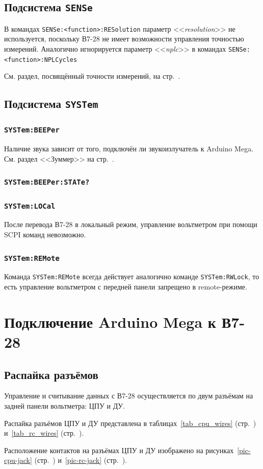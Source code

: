 \documentclass[12pt, a4paper]{article}
\newcommand{\V}{\mbox{В7-28}}
\newcommand{\Arduino}{Arduino Mega}
\newcommand{\CMD}[1]{{\tt #1}}
\newcommand{\PARAM}[1]{<<{\it #1}>>}
\newcommand{\SUBSYSTEMSECTION}[1]{\subsection{Подсистема \CMD{#1}}}
\newcommand{\CMDSECTION}[1]{\subsubsection*{\CMD{#1}}}
\begin{document}
\SUBSYSTEMSECTION{SENSe}

В командах \CMD{SENSe:<function>:RESolution} параметр \PARAM{resolution} не используется, поскольку \V{} не имеет возможности управления точностью измерений. Аналогично игнорируется параметр \PARAM{nplc} в командах \CMD{SENSe:<function>:NPLCycles}

См. раздел, посвящённый точности измерений, на стр.~\pageref{sec_precision}.

\SUBSYSTEMSECTION{SYSTem}

\CMDSECTION{SYSTem:BEEPer}

Наличие звука зависит от того, подключён ли звукоизлучатель к \Arduino{}. См. раздел <<Зуммер>> на стр.~\pageref{sec_zummer}.

\CMDSECTION{SYSTem:BEEPer:STATe?}
\CMDSECTION{SYSTem:LOCal}

После перевода \V{} в локальный режим, управление вольтметром при помощи SCPI команд невозможно.

\CMDSECTION{SYSTem:REMote}

Команда \CMD{SYSTem:REMote} всегда действует аналогично команде \CMD{SYSTem:RWLock}, то есть управление вольтметром с передней панели запрещено в remote-режиме.

\section{Подключение {\Arduino} к \V}

\subsection{Распайка разъёмов}

Управление и считывание данных с {\V} осуществляется по двум разъёмам на задней панели вольтметра: ЦПУ и ДУ.

Распайка разъёмов ЦПУ и ДУ представлена в таблицах~\ref{tab_cpu_wires} (стр.~\pageref{tab_cpu_wires}) и~\ref{tab_rc_wires} (стр.~\pageref{tab_rc_wires}).

Расположение контактов на разъёмах ЦПУ и ДУ изображено на рисунках~\ref{pic-cpu-jack} (стр.~\pageref{pic-cpu-jack}) и~\ref{pic-rc-jack} (стр.~\pageref{pic-rc-jack}).
\end{document}
